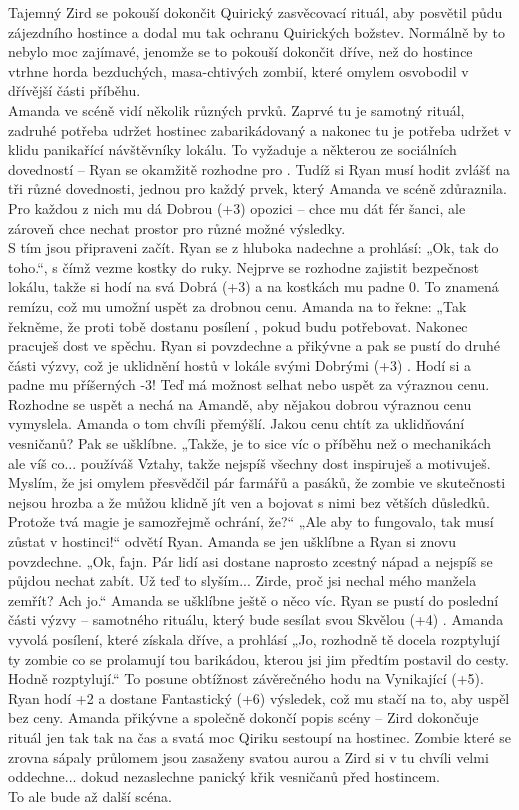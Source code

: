 Tajemný Zird se pokouší dokončit Quirický zasvěcovací rituál, aby posvětil půdu zájezdního hostince a dodal mu tak ochranu Quirických božstev. Normálně by to nebylo moc zajímavé, jenomže se to pokouší dokončit dříve, než do hostince vtrhne horda bezduchých, masa-chtivých zombií, které omylem osvobodil v dřívější části příběhu.\\
Amanda ve scéně vidí několik různých prvků. Zaprvé tu je samotný rituál, zadruhé potřeba udržet hostinec zabarikádovaný a nakonec tu je potřeba udržet v klidu panikařící návštěvníky lokálu. To vyžaduje a některou ze sociálních dovedností – Ryan se okamžitě rozhodne pro . Tudíž si Ryan musí hodit zvlášť na tři různé dovednosti, jednou pro každý prvek, který Amanda ve scéně zdůraznila. Pro každou z nich mu dá Dobrou (+3) opozici – chce mu dát fér šanci, ale zároveň chce nechat prostor pro různé možné výsledky.\\
S tím jsou připraveni začít. Ryan se z hluboka nadechne a prohlásí: „Ok, tak do toho.“, s čímž vezme kostky do ruky. Nejprve se rozhodne zajistit bezpečnost lokálu, takže si hodí na svá Dobrá (+3)  a na kostkách mu padne 0. To znamená remízu, což mu umožní uspět za drobnou cenu. Amanda na to řekne: „Tak řekněme, že proti tobě dostanu posílení , pokud budu potřebovat. Nakonec pracuješ dost ve spěchu. Ryan si povzdechne a přikývne a pak se pustí do druhé části výzvy, což je uklidnění hostů v lokále svými Dobrými (+3) . Hodí si a padne mu příšerných -3! Teď má možnost selhat nebo uspět za výraznou cenu. Rozhodne se uspět a nechá na Amandě, aby nějakou dobrou výraznou cenu vymyslela. Amanda o tom chvíli přemýšlí. Jakou cenu chtít za uklidňování vesničanů? Pak se ušklíbne. „Takže, je to sice víc o příběhu než o mechanikách ale víš co... používáš Vztahy, takže nejspíš všechny dost inspiruješ a motivuješ. Myslím, že jsi omylem přesvědčil pár farmářů a pasáků, že zombie ve skutečnosti nejsou hrozba a že můžou klidně jít ven a bojovat s nimi bez větších důsledků. Protože tvá magie je samozřejmě ochrání, že?“ „Ale aby to fungovalo, tak musí zůstat v hostinci!“ odvětí Ryan. Amanda se jen ušklíbne a Ryan si znovu povzdechne. „Ok, fajn. Pár lidí asi dostane naprosto zcestný nápad a nejspíš se půjdou nechat zabít. Už teď to slyším... Zirde, proč jsi nechal mého manžela zemřít? Ach jo.“ Amanda se ušklíbne ještě o něco víc. Ryan se pustí do poslední části výzvy – samotného rituálu, který bude sesílat svou Skvělou (+4) . Amanda vyvolá posílení, které získala dříve, a prohlásí „Jo, rozhodně tě docela rozptylují ty zombie co se prolamují tou barikádou, kterou jsi jim předtím postavil do cesty. Hodně rozptylují.“ To posune obtížnost závěrečného hodu na Vynikající (+5). Ryan hodí +2 a dostane Fantastický (+6) výsledek, což mu stačí na to, aby uspěl bez ceny. Amanda přikývne a společně dokončí popis scény – Zird dokončuje rituál jen tak tak na čas a svatá moc Qiriku sestoupí na hostinec. Zombie které se zrovna sápaly průlomem jsou zasaženy svatou aurou a Zird si v tu chvíli velmi oddechne... dokud nezaslechne panický křik vesničanů před hostincem.\\
To ale bude až další scéna.


